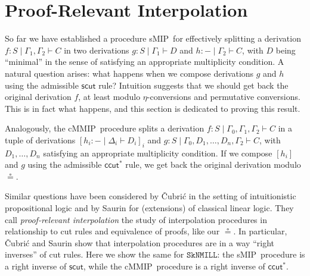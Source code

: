 \documentclass[sn-mathphys-num]{sn-jnl}%
\newcommand{\GG}{\Gamma}
\newcommand{\GD}{\Delta}
\newcommand{\vd}{\vdash}
\newcommand{\SkNMILL}{$\mathtt{SkNMILL}$}
\newcommand{\mf}[1]{\mathsf{#1}}
\newcommand{\sMIP}{\textsf{sMIP}}
\newcommand{\cMMIP}{\textsf{cMMIP}}
\theoremstyle{thmstyleone}%
\theoremstyle{thmstyletwo}%
\theoremstyle{thmstylethree}%
\begin{document}
\section{Proof-Relevant Interpolation}\label{sec:proof-rel} 

So far we have established a procedure \sMIP~for effectively splitting a derivation $f : S \mid \GG_1 , \GG_2 \vd C$ in two derivations $g : S \mid \GG_1 \vd D$ and $h : {-} \mid \GG_2 \vd C$, with $D$ being ``minimal'' in the sense of satisfying an appropriate multiplicity condition.
A natural question arises: what happens when we compose derivations $g$ and $h$ using the admissible $\mathsf{scut}$ rule?
Intuition suggests that we should get back the original derivation $f$, at least modulo $\eta$-conversions and permutative conversions.
This is in fact what happens, and this section is dedicated to proving this result.

Analogously, the \cMMIP~procedure splits a derivation $f : S \mid \GG_0,\GG_1,\GG_2 \vd C$ in a tuple of derivations $[h_i : {-} \mid \GD_i \vd D_i]_i$ and $g : S \mid \GG_0,D_1,\dots,D_n,\GG_2 \vd C$, with $D_1,\dots,D_n$ satisfying an appropriate multiplicity condition.
If we compose $[h_i]$ and $g$ using the admissible $\mathsf{ccut^*}$ rule, we get back the original derivation modulo $\circeq$.

Similar questions have been considered by {\v{C}}ubri{\'c} \cite{Cubric1994} in the setting of intuitionistic propositional logic and by Saurin \cite{Saurin2024} for (extensions) of classical linear logic.
They call \emph{proof-relevant interpolation} the study of interpolation procedures in relationship to cut rules and equivalence of proofs, like our $\circeq$.
In particular, {\v{C}}ubri{\'c} and Saurin show that interpolation procedures are in a way ``right inverses'' of cut rules.
Here we show the same for \SkNMILL: the \sMIP~procedure is a right inverse of $\mf{scut}$, while the \cMMIP~procedure is a right inverse of $\mathsf{ccut^*}$. 
\end{document}
